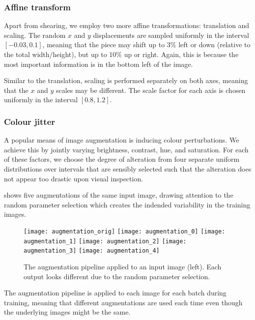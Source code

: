\documentclass[../main.tex]{subfiles}
\begin{document}
\subsubsection{Affine transform}
Apart from shearing, we employ two more affine transformations: translation and scaling.
The random $x$ and $y$ displacements are sampled uniformly in the interval $[-0.03, 0.1]$, meaning that the piece may shift up to 3\% left or down (relative to the total width/height), but up to 10\% up or right.
Again, this is because the most important information is in the bottom left of the image.

Similar to the translation, scaling is performed separately on both axes, meaning that the $x$ and $y$ scales may be different.
The scale factor for each axis is chosen uniformly in the interval $[0.8, 1.2]$.

\subsubsection{Colour jitter}
A popular means of image augmentation is inducing colour perturbations.
We achieve this by jointly varying brightness, contrast, hue, and saturation.
For each of these factors, we choose the degree of alteration from four separate uniform distributions over intervals that are sensibly selected such that the alteration does not appear too drastic upon visual inspection.

 shows five augmentations of the same input image, drawing attention to the random parameter selection which creates the indended variability in the training images.
\begin{figure}
    \centering
    \texttt{[image: augmentation\_orig]}
    \texttt{[image: augmentation\_0]}
    \texttt{[image: augmentation\_1]}
    \texttt{[image: augmentation\_2]}
    \texttt{[image: augmentation\_3]}
    \texttt{[image: augmentation\_4]}
    \caption[The augmentation pipeline applied to an input image.]{The augmentation pipeline applied to an input image (left). Each output looks different due to the random parameter selection.}
    \label{fig:augmentations}
\end{figure}
The augmentation pipeline is applied to each image for each batch during training, meaning that different augmentations are used each time even though the underlying images might be the same.
\end{document}
